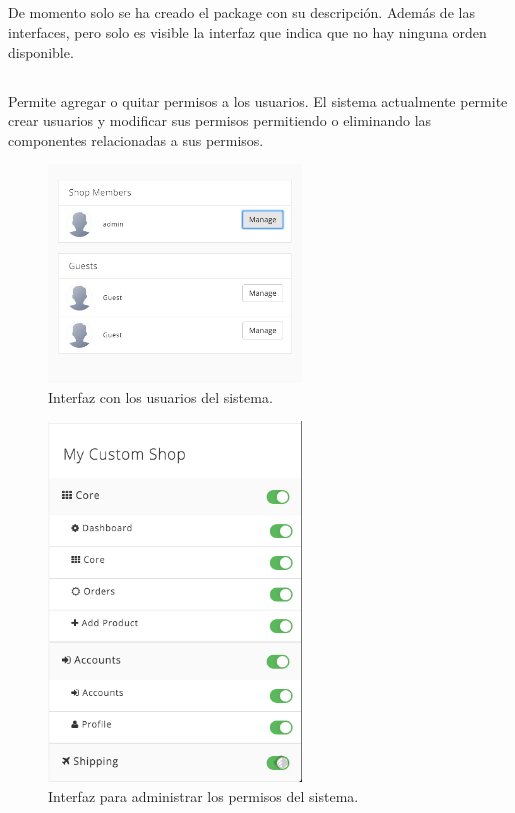 \subsection{\ordersEF}

	De momento solo se ha creado el package con su descripción. Además de las interfaces, pero solo es visible la interfaz que indica que no hay ninguna orden disponible.

\subsection{\accountsEF}

	Permite agregar o quitar permisos a los usuarios. El sistema actualmente permite crear usuarios y modificar sus permisos permitiendo o eliminando las componentes relacionadas a sus permisos.

	\begin{figure}[H]
		\centering
		\includegraphics[width=0.6\textwidth]{figuras/dashboard/account/users.png}
		\caption{Interfaz con los usuarios del sistema.}
		\label{figure:dashboard:account:users}
	\end{figure}


	\begin{figure}[H]
		\centering
		\includegraphics[width=0.6\textwidth]{figuras/dashboard/account/permisos.png}
		\caption{Interfaz para administrar los permisos del sistema.}
		\label{figure:dashboard:account:permisos}
	\end{figure}

